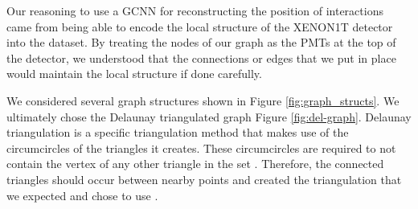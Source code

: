 \documentclass[../thesis.tex]{subfiles}
\begin{document}
\par Our reasoning to use a GCNN for reconstructing the position of interactions came from being able to encode the local structure of the XENON1T detector into the dataset.
By treating the nodes of our graph as the PMTs at the top of the detector, we understood that the connections or edges that we put in place would maintain the local structure if done carefully.

\par We considered several graph structures shown in Figure \ref{fig:graph_structs}.
We ultimately chose the Delaunay triangulated graph Figure \ref{fig:del-graph}.
Delaunay triangulation is a specific triangulation method that makes use of the circumcircles of the triangles it creates.
These circumcircles are required to not contain the vertex of any other triangle in the set \cite{Delaunay}.
Therefore, the connected triangles should occur between nearby points and created the triangulation that we expected and chose to use \cite{Delaunay}.
\end{document}
